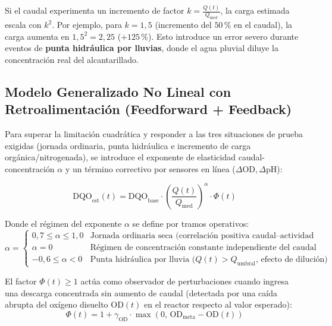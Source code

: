 \documentclass[11pt, a4paper]{article}
\begin{document}
Si el caudal experimenta un incremento de factor $k = \frac{Q(t)}{Q_{\text{med}}}$, la carga estimada escala con $k^2$. Por ejemplo, para $k = 1{,}5$ (incremento del $50\,\%$ en el caudal), la carga aumenta en $1{,}5^2 = 2{,}25$ ($+125\,\%$). Esto introduce un error severo durante eventos de \textbf{punta hidráulica por lluvias}, donde el agua pluvial diluye la concentración real del alcantarillado.

\subsection{Modelo Generalizado No Lineal con Retroalimentación (Feedforward + Feedback)}
Para superar la limitación cuadrática y responder a las tres situaciones de prueba exigidas (jornada ordinaria, punta hidráulica e incremento de carga orgánica/nitrogenada), se introduce el exponente de elasticidad caudal-concentración $\alpha$ y un término correctivo por sensores en línea ($\Delta\text{OD}, \Delta\text{pH}$):

\begin{equation}
    \text{DQO}_{\text{est}}(t) = \text{DQO}_{\text{base}} \cdot \left(\frac{Q(t)}{Q_{\text{med}}}\right)^{\alpha} \cdot \Phi(t)
    \label{eq:dqo_general}
\end{equation}

Donde el régimen del exponente $\alpha$ se define por tramos operativos:
\begin{equation}
    \alpha = 
    \begin{cases} 
        0{,}7 \le \alpha \le 1{,}0 & \text{Jornada ordinaria seca (correlación positiva caudal--actividad urbana)} \\
        \alpha = 0 & \text{Régimen de concentración constante independiente del caudal} \\
        -0{,}6 \le \alpha < 0 & \text{Punta hidráulica por lluvia ($Q(t) > Q_{\text{umbral}}$, efecto de dilución)}
    \end{cases}
\end{equation}

El factor $\Phi(t) \ge 1$ actúa como observador de perturbaciones cuando ingresa una descarga concentrada sin aumento de caudal (detectada por una caída abrupta del oxígeno disuelto $\text{OD}(t)$ en el reactor respecto al valor esperado):
\begin{equation}
    \Phi(t) = 1 + \gamma_{\text{OD}} \cdot \max\left(0, \, \text{OD}_{\text{meta}} - \text{OD}(t)\right)
\end{equation}
\end{document}
